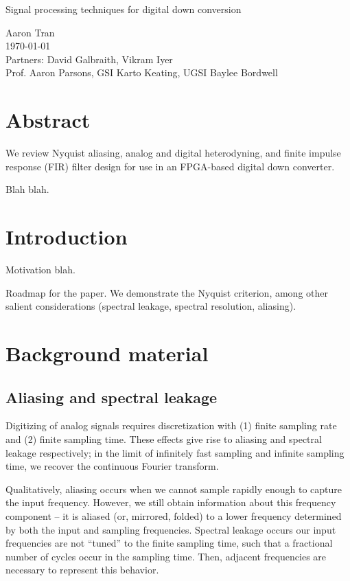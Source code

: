 \documentclass[11pt]{article}
\begin{document}
\begin{center}
\Large{Signal processing techniques for digital down conversion}

\large
Aaron Tran \\
\today \\
Partners: David Galbraith, Vikram Iyer \\
Prof. Aaron Parsons, GSI Karto Keating, UGSI Baylee Bordwell
\end{center}

\section*{Abstract}

We review Nyquist aliasing, analog and digital heterodyning, and finite impulse
response (FIR) filter design for use in an FPGA-based digital down converter.

Blah blah.

\section{Introduction}

Motivation blah.

Roadmap for the paper.
We demonstrate the Nyquist criterion, among other salient considerations
(spectral leakage, spectral resolution, aliasing). 

\section{Background material}

\subsection{Aliasing and spectral leakage}

Digitizing of analog signals requires discretization with (1) finite sampling
rate and (2) finite sampling time.  These effects give rise to aliasing and
spectral leakage respectively; in the limit of infinitely fast sampling and
infinite sampling time, we recover the continuous Fourier transform.

Qualitatively, aliasing occurs when we cannot sample rapidly enough to capture
the input frequency.  However, we still obtain information about this frequency
component -- it is aliased (or, mirrored, folded) to a lower frequency
determined by both the input and sampling frequencies.  Spectral leakage occurs
our input frequencies are not ``tuned'' to the finite sampling time, such that
a fractional number of cycles occur in the sampling time.  Then, adjacent
frequencies are necessary to represent this behavior.
\end{document}

